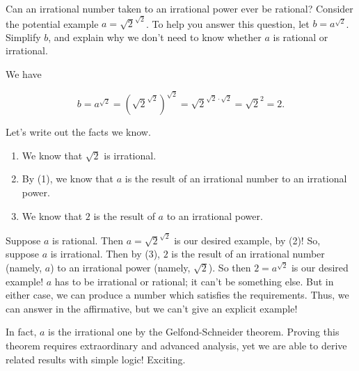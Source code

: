 \documentclass[../key.tex]{subfiles}
\begin{document}
\begin{outer_problem}
\item Can an irrational number taken to an irrational power ever be rational? Consider the potential example $a = \sqrt{2}^{\sqrt{2}}$. To help you answer this question, let $b = a^{\sqrt{2}}$. Simplify $b$, and explain why we don’t need to know whether $a$ is rational or irrational.
\end{outer_problem}

\noindent We have

$$b = a^{\sqrt{2}} = \left(\sqrt{2}^{\sqrt{2}}\right)^{\sqrt{2}} = \sqrt{2} ^ {\sqrt{2}\cdot \sqrt{2}} = \sqrt{2}^2 = 2.$$

\noindent Let's write out the facts we know.

\begin{enumerate}
    \item We know that $\sqrt{2}$ is irrational. \\
    \item By (1), we know that $a$ is the result of an irrational number to an irrational power. \\
    \item We know that $2$ is the result of $a$ to an irrational power. \\
\end{enumerate}

\noindent Suppose $a$ is rational. Then $a=\sqrt{2}^{\sqrt{2}}$ is our desired example, by (2)! So, suppose $a$ is irrational. Then by (3), $2$ is the result of an irrational number (namely, $a$) to an irrational power (namely, $\sqrt{2}$). So then $2=a^{\sqrt{2}}$ is our desired example! $a$ has to be irrational or rational; it can't be something else. But in either case, we can produce a number which satisfies the requirements. Thus, we can answer in the affirmative, but we can't give an explicit example!

In fact, $a$ is the irrational one by the Gelfond-Schneider theorem. Proving this theorem requires extraordinary and advanced analysis, yet we are able to derive related results with simple logic! Exciting.
\end{document}
